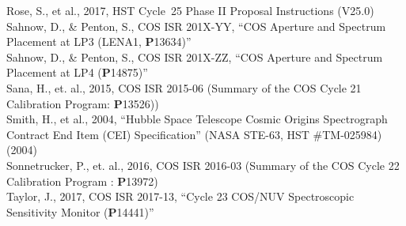 \documentclass{stsci_report}
\newcommand{\pid}[1]{{\bf P}#1}
\begin{document}
Rose, S., et al., 2017, HST Cycle~25 Phase II Proposal Instructions (V25.0)\\
Sahnow, D., \& Penton, S., COS ISR 201X-YY, ``COS Aperture and Spectrum Placement at LP3 (LENA1, \pid{13634})''\\
Sahnow, D., \& Penton, S., COS ISR 201X-ZZ, ``COS Aperture and Spectrum Placement at LP4 (\pid{14875})''\\
Sana, H., et. al., 2015, COS ISR 2015-06 (Summary of the COS Cycle 21 Calibration Program: \pid{13526}))\\
Smith, H., et al., 2004, ``Hubble Space Telescope Cosmic Origins Spectrograph Contract End Item (CEI) Specification'' (NASA STE-63, HST \#TM-025984) (2004)\\
Sonnetrucker, P., et. al., 2016, COS ISR 2016-03 (Summary of the COS Cycle 22 Calibration Program : \pid{13972}) \\
Taylor, J., 2017, COS ISR 2017-13, ``Cycle 23 COS/NUV Spectroscopic Sensitivity Monitor (\pid{14441})''\\
\normalsize
\newpage
\clearpage

\end{document}
